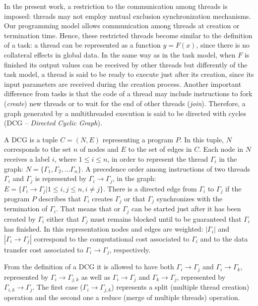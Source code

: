\documentclass[twocolumn]{svjour3}
\begin{document}
In the present work, a restriction to the communication among threads is imposed: threads may not employ mutual exclusion synchronization mechanisms. Our programming model allows communication among threads at creation or termination time.
Hence, these restricted threads become similar to the definition of a task: a thread can be represented as a function $y = F(x)$, since there is no collateral effects in global data. In the same way as in the task model, when $F$ is finished its output values can be received by other threads but differently of the task model, a thread is said to be ready to execute just after its creation, since its input parameters are received during the creation process. Another important difference from tasks is that the code of a thread may include instructions to fork (\emph{create}) new threads or to wait for the end of other threads (\emph{join}). Therefore, a graph generated by a multithreaded execution is said to be directed with cycles (DCG – {\em Directed Cyclic Graph}).

\begin{definition}
A DCG is a tuple $C = (N, E) $ representing a program $P$. In this tuple, $N$ corresponds to the set $n$ of nodes and $E$ to the set of edges in $C$.
Each node in $N$ receives a label $i$, where $1 \le i \le n$, in order to represent the thread $\Gamma_i$ in the graph: $N = \{\Gamma_1, \Gamma_2, … \Gamma_n\}$.
A precedence order among instructions of two threads $\Gamma_i$ and $\Gamma_j$ is represented by $\Gamma_i \rightarrow \Gamma_j$, in the graph: $E = \{\Gamma_i \rightarrow \Gamma_j | 1 \le i,j \le n, i \neq j\}$.
There is a directed edge from $\Gamma_i$ to $\Gamma_j$ if the program $P$ describes that $\Gamma_i$ creates $\Gamma_j$ or that $\Gamma_j$ synchronizes with the termination of $\Gamma_i$. That means that or $\Gamma_j$ can be started just after it has been created by $\Gamma_i$ either that $\Gamma_j$ must remains blocked until to be guaranteed that $\Gamma_i$ has finished.
In this representation nodes and edges are weighted: $|\Gamma_i|$ and $|\Gamma_i \rightarrow \Gamma_j|$ correspond to the computational cost associated to $\Gamma_i$ and to the data transfer cost associated to $\Gamma_i \rightarrow \Gamma_j$, respectively.
\end{definition}

From the definition of a DCG it is allowed to have both $\Gamma_i \rightarrow \Gamma_j$ and $\Gamma_i \rightarrow \Gamma_k$, represented by $\Gamma_i \rightarrow \Gamma_{j,k}$ as well as $\Gamma_i \rightarrow \Gamma_j$ and $\Gamma_k \rightarrow \Gamma_j$, represented by $\Gamma_{i,k} \rightarrow \Gamma_j$. The first case ($\Gamma_i \rightarrow \Gamma_{j,k}$) represents a split (multiple thread creation) operation and the second one a reduce (merge of multiple threads) operation.
\end{document}
